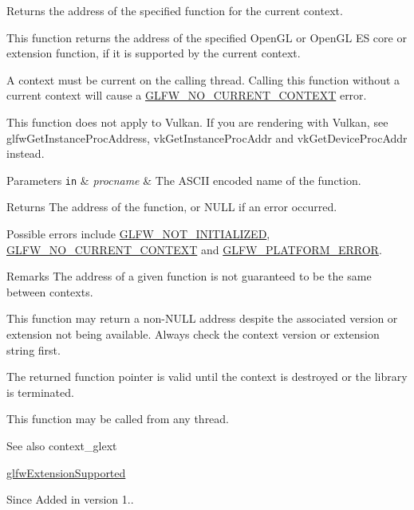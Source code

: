 Returns the address of the specified function for the current context. 

This function returns the address of the specified Open\+GL or Open\+GL ES core or extension function, if it is supported by the current context.

A context must be current on the calling thread. Calling this function without a current context will cause a \hyperlink{group__errors_gaa8290386e9528ccb9e42a3a4e16fc0d0}{G\+L\+F\+W\+\_\+\+N\+O\+\_\+\+C\+U\+R\+R\+E\+N\+T\+\_\+\+C\+O\+N\+T\+E\+XT} error.

This function does not apply to Vulkan. If you are rendering with Vulkan, see glfw\+Get\+Instance\+Proc\+Address, {\ttfamily vk\+Get\+Instance\+Proc\+Addr} and {\ttfamily vk\+Get\+Device\+Proc\+Addr} instead.


\begin{DoxyParams}[1]{Parameters}
\mbox{\tt in}  & {\em procname} & The A\+S\+C\+II encoded name of the function. \\
\hline
\end{DoxyParams}
\begin{DoxyReturn}{Returns}
The address of the function, or {\ttfamily N\+U\+LL} if an error occurred.
\end{DoxyReturn}
Possible errors include \hyperlink{group__errors_ga2374ee02c177f12e1fa76ff3ed15e14a}{G\+L\+F\+W\+\_\+\+N\+O\+T\+\_\+\+I\+N\+I\+T\+I\+A\+L\+I\+Z\+ED}, \hyperlink{group__errors_gaa8290386e9528ccb9e42a3a4e16fc0d0}{G\+L\+F\+W\+\_\+\+N\+O\+\_\+\+C\+U\+R\+R\+E\+N\+T\+\_\+\+C\+O\+N\+T\+E\+XT} and \hyperlink{group__errors_gad44162d78100ea5e87cdd38426b8c7a1}{G\+L\+F\+W\+\_\+\+P\+L\+A\+T\+F\+O\+R\+M\+\_\+\+E\+R\+R\+OR}.

\begin{DoxyRemark}{Remarks}
The address of a given function is not guaranteed to be the same between contexts.

This function may return a non-\/{\ttfamily N\+U\+LL} address despite the associated version or extension not being available. Always check the context version or extension string first.
\end{DoxyRemark}
The returned function pointer is valid until the context is destroyed or the library is terminated.

This function may be called from any thread.

\begin{DoxySeeAlso}{See also}
context\+\_\+glext 

\hyperlink{group__context_ga9a28c712d35f9e43534e1d03b051c04c}{glfw\+Extension\+Supported}
\end{DoxySeeAlso}
\begin{DoxySince}{Since}
Added in version 1.. 
\end{DoxySince}
\mbox{\label{group__context_gafd76c93e15ec8b0b90506a9936a46185}} 
